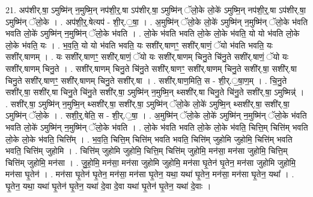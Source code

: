 \documentclass[17pt]{extarticle}
\begin{document}
21. अप॑शीर्.षा॒ ऽमुष्मि॑न् न॒मुष्मि॒न् नप॑शी॒र्॒.षा ऽप॑शीर्.षा॒ ऽमुष्मि॑न् ॅलो॒के लो॒के॑ ऽमुष्मि॒न् नप॑शी॒र्॒.षा ऽप॑शीर्.षा॒ ऽमुष्मि॑न् ॅलो॒के । . अप॑शी॒र्॒.षेत्यप॑ - शी॒र्.॒षा॒ । . अ॒मुष्मि॑न् ॅलो॒के लो॒के॑ ऽमुष्मि॑न् न॒मुष्मि॑न् ॅलो॒के भ॑वति भवति लो॒के॑ ऽमुष्मि॑न् न॒मुष्मि॑न् ॅलो॒के भ॑वति । . लो॒के भ॑वति भवति लो॒के लो॒के भ॑वति॒ यो यो भ॑वति लो॒के लो॒के भ॑वति॒ यः । . भ॒व॒ति॒ यो यो भ॑वति भवति॒ यः सशी॑र्.षाणꣳ॒॒ सशी॑र्.षाणं॒ ॅयो भ॑वति भवति॒ यः सशी॑र्.षाणम् । . यः सशी॑र्.षाणꣳ॒॒ सशी॑र्.षाणं॒ ॅयो यः सशी॑र्.षाणम् चिनु॒ते चि॑नु॒ते सशी॑र्.षाणं॒ ॅयो यः सशी॑र्.षाणम् चिनु॒ते । . सशी॑र्.षाणम् चिनु॒ते चि॑नु॒ते सशी॑र्.षाणꣳ॒॒ सशी॑र्.षाणम् चिनु॒ते सशी॑र्.षा॒ सशी॑र्.षा चिनु॒ते सशी॑र्.षाणꣳ॒॒ सशी॑र्.षाणम् चिनु॒ते सशी॑र्.षा । . सशी॑र्.षाण॒मिति॒ स - शी॒र्.॒षा॒ण॒म् । . चि॒नु॒ते सशी॑र्.षा॒ सशी॑र्.षा चिनु॒ते चि॑नु॒ते सशी॑र्.षा॒ ऽमुष्मि॑न् न॒मुष्मि॒न् थ्सशी॑र्.षा चिनु॒ते चि॑नु॒ते सशी॑र्.षा॒ ऽमुष्मिन्न्॑ । . सशी॑र्.षा॒ ऽमुष्मि॑न् न॒मुष्मि॒न् थ्सशी॑र्.षा॒ सशी॑र्.षा॒ ऽमुष्मि॑न् ॅलो॒के लो॒के॑ ऽमुष्मि॒न् थ्सशी॑र्.षा॒ सशी॑र्.षा॒ ऽमुष्मि॑न् ॅलो॒के । . सशी॒र्॒.षेति॒ स - शी॒र्.॒षा॒ । . अ॒मुष्मि॑न् ॅलो॒के लो॒के॑ ऽमुष्मि॑न् न॒मुष्मि॑न् ॅलो॒के भ॑वति भवति लो॒के॑ ऽमुष्मि॑न् न॒मुष्मि॑न् ॅलो॒के भ॑वति । . लो॒के भ॑वति भवति लो॒के लो॒के भ॑वति॒ चित्ति॒म् चित्ति॑म् भवति लो॒के लो॒के भ॑वति॒ चित्ति᳚म् । . भ॒व॒ति॒ चित्ति॒म् चित्ति॑म् भवति भवति॒ चित्ति॑म् जुहोमि जुहोमि॒ चित्ति॑म् भवति भवति॒ चित्ति॑म् जुहोमि । . चित्ति॑म् जुहोमि जुहोमि॒ चित्ति॒म् चित्ति॑म् जुहोमि॒ मन॑सा॒ मन॑सा जुहोमि॒ चित्ति॒म् चित्ति॑म् जुहोमि॒ मन॑सा । . जु॒हो॒मि॒ मन॑सा॒ मन॑सा जुहोमि जुहोमि॒ मन॑सा घृ॒तेन॑ घृ॒तेन॒ मन॑सा जुहोमि जुहोमि॒ मन॑सा घृ॒तेन॑ । . मन॑सा घृ॒तेन॑ घृ॒तेन॒ मन॑सा॒ मन॑सा घृ॒तेन॒ यथा॒ यथा॑ घृ॒तेन॒ मन॑सा॒ मन॑सा घृ॒तेन॒ यथा᳚ । . घृ॒तेन॒ यथा॒ यथा॑ घृ॒तेन॑ घृ॒तेन॒ यथा॑ दे॒वा दे॒वा यथा॑ घृ॒तेन॑ घृ॒तेन॒ यथा॑ दे॒वाः । \newline
\end{document}

